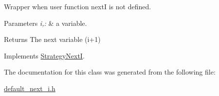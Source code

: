 \-Wrapper when user function next\-I is not defined. 


\begin{DoxyParams}{\-Parameters}
{\em i,\-:} & a variable. \\
\hline
\end{DoxyParams}
\begin{DoxyReturn}{\-Returns}
\-The next variable (i+1) 
\end{DoxyReturn}


\-Implements \hyperlink{classStrategyNextI_a3ae2498d9c8c316b9248e08c9d5ec3a3}{\-Strategy\-Next\-I}.



\-The documentation for this class was generated from the following file\-:\begin{DoxyCompactItemize}
\item 
\hyperlink{default__next__i_8h}{default\-\_\-next\-\_\-i.\-h}\end{DoxyCompactItemize}
